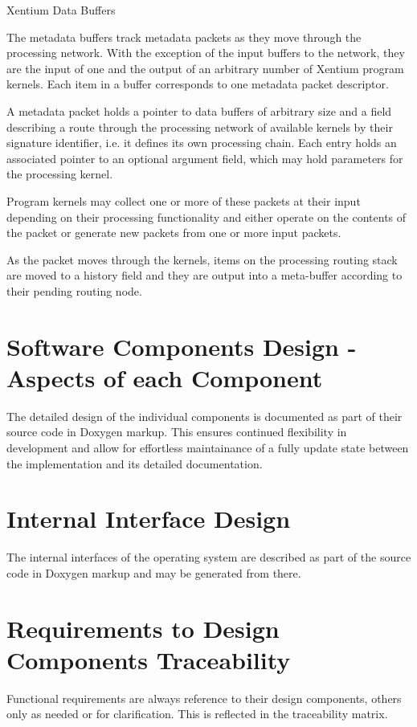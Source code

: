 %
{Xentium Data Buffers}{%
The metadata buffers track metadata packets as they move through the processing
network. With the exception of the input buffers to the network, they are
the input of one and the output of an arbitrary number of \gls{Xentium} program
kernels. Each item in a buffer corresponds to one metadata packet descriptor.
\newline

A metadata packet holds a pointer to data buffers of arbitrary size and a
field describing a route through the processing network of available kernels
by their signature identifier, i.e. it defines its own processing chain.
Each entry holds an associated pointer to an optional argument field, which may
hold parameters for the processing kernel. \newline

Program kernels may collect one or more of these packets at their input
depending on their processing functionality and either operate on the contents
of the packet or generate new packets from one or more input packets.
\newline

As the packet moves through the kernels, items on the processing routing 
stack are moved to a history field and they are output into a meta-buffer
according to their pending routing node.
}%
{}{}





\section{Software Components Design - Aspects of each Component}

The detailed design of the individual components is documented as part of 
their source code in Doxygen markup. This ensures continued flexibility in
development and allow for effortless maintainance of a fully update state
between the implementation and its detailed documentation.

\section{Internal Interface Design}

The internal interfaces of the operating system are described as part of the
source code in Doxygen markup and may be generated from there.

\section{Requirements to Design Components Traceability}

\noindent
Functional requirements are always reference to their design components, others
only as needed or for clarification. This is reflected in the traceability
matrix.

\traceabilitymatrix


